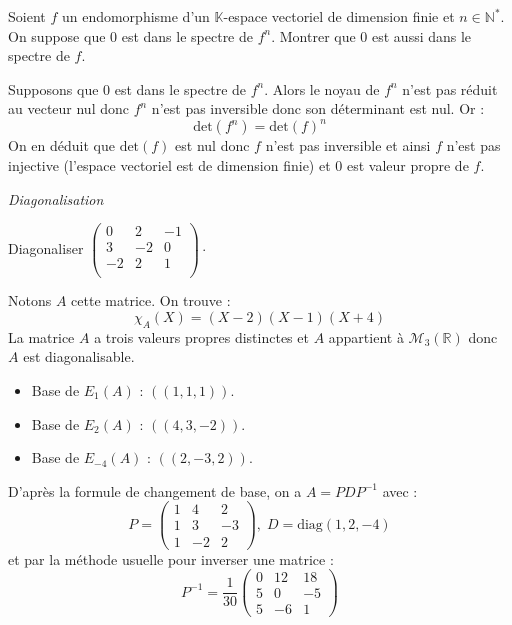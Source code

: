 \documentclass[a4paper,10pt]{report}
\begin{document}
\begin{Exa} Soient $f$ un endomorphisme d'un $\mathbb{K}$-espace vectoriel de dimension finie et $n \in \mathbb{N}^{*}$. On suppose que $0$ est dans le spectre de $f^n$. Montrer que $0$ est aussi dans le spectre de $f$.
\end{Exa}

\corr Supposons que $0$ est dans le spectre de $f^n$. Alors le noyau de $f^n$ n'est pas réduit au vecteur nul donc $f^n$ n'est pas inversible donc son déterminant est nul. Or :
$$ \textrm{det}(f^n) = \textrm{det}(f)^n$$
On en déduit que $\textrm{det}(f)$ est nul donc $f$ n'est pas inversible et ainsi $f$ n'est pas injective (l'espace vectoriel est de dimension finie) et $0$ est valeur propre de $f$.

\medskip

\begin{center}
\textit{{ {\large Diagonalisation}}}
\end{center}

\medskip

\begin{Exa} Diagonaliser $\begin{pmatrix}
0 & 2 & -1 \\
3 & -2 & 0 \\
-2 & 2 & 1 \\
\end{pmatrix}\cdot$
\end{Exa}

\corr Notons $A$ cette matrice. On trouve :
$$ \chi_A(X) = (X-2)(X-1)(X+4)$$
La matrice $A$ a trois valeurs propres distinctes et $A$ appartient à $\mathcal{M}_3(\mathbb{R})$ donc $A$ est diagonalisable.
\begin{itemize}
\item Base de $E_1(A)$ : $((1,1,1))$.
\item Base de $E_2(A)$ : $((4,3,-2))$.
\item Base de $E_{-4}(A)$ : $((2,-3,2))$.
\end{itemize}
D'après la formule de changement de base, on a $A = PDP^{-1}$ avec :
$$ P = \begin{pmatrix}
1 & 4 & 2 \\
1 & 3 & -3 \\
1 & -2 & 2
\end{pmatrix}, \; D=\textrm{diag}(1,2,-4)$$
et par la méthode usuelle pour inverser une matrice :
$$ P^{-1} = \dfrac{1}{30} \begin{pmatrix}
0 & 12 & 18 \\
5 & 0 & -5 \\
5 & -6 & 1 
\end{pmatrix}$$
\end{document}
